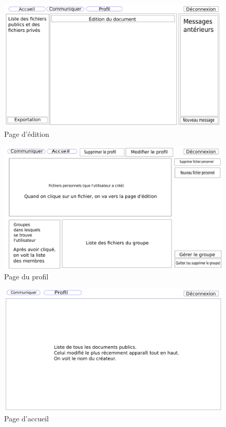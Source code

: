 \documentclass[a4paper, 12pt]{article}
\begin{document}
\begin{figure}[H]
  \begin{center}
    \includegraphics[scale=0.3]{edition.png}
  \end{center}
  \caption{Page d'édition}
\end{figure}

\begin{figure}[H]
  \begin{center}
    \includegraphics[scale=0.3]{profil.png}
  \end{center}
  \caption{Page du profil}
\end{figure}

\begin{figure}[H]
  \begin{center}
    \includegraphics[scale=0.3]{acceuil.png}
  \end{center}
  \caption{Page d'accueil}
\end{figure}
\end{document}
